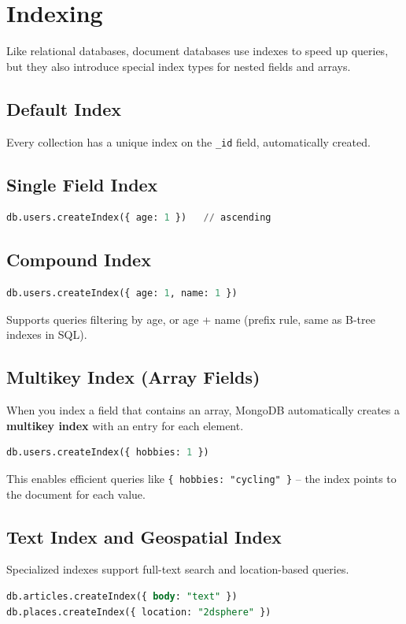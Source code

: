 \documentclass[12pt,a4paper]{article}
\begin{document}
\section{Indexing}
Like relational databases, document databases use indexes to speed up queries, but they also introduce special index types for nested fields and arrays.

\subsection{Default Index}
Every collection has a unique index on the \texttt{\_id} field, automatically created.

\subsection{Single Field Index}
\begin{lstlisting}[language=SQL]
db.users.createIndex({ age: 1 })   // ascending
\end{lstlisting}

\subsection{Compound Index}
\begin{lstlisting}[language=SQL]
db.users.createIndex({ age: 1, name: 1 })
\end{lstlisting}
Supports queries filtering by age, or age + name (prefix rule, same as B-tree indexes in SQL).

\subsection{Multikey Index (Array Fields)}
When you index a field that contains an array, MongoDB automatically creates a \textbf{multikey index} with an entry for each element.
\begin{lstlisting}[language=SQL]
db.users.createIndex({ hobbies: 1 })
\end{lstlisting}
This enables efficient queries like \texttt{\{ hobbies: "cycling" \}} -- the index points to the document for each value.

\subsection{Text Index and Geospatial Index}
Specialized indexes support full-text search and location-based queries.
\begin{lstlisting}[language=SQL]
db.articles.createIndex({ body: "text" })
db.places.createIndex({ location: "2dsphere" })
\end{lstlisting}
\end{document}
